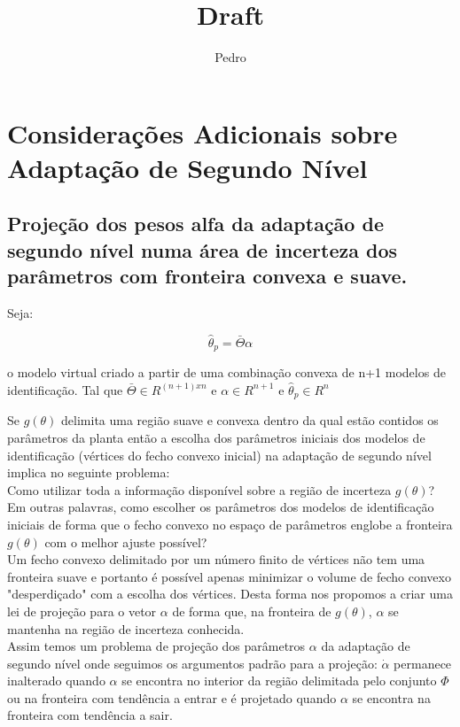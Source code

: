 \documentclass[11pt]{report}
\title{Draft}
\author{Pedro}
\begin{document}
\chapter{Considerações Adicionais sobre Adaptação de Segundo Nível}
\section{Projeção dos pesos alfa da adaptação de segundo nível numa área de incerteza dos parâmetros com fronteira convexa e suave.}

Seja:

\begin{equation}
\hat{\theta}_p = \bar{\Theta}\alpha 
\end{equation}

o modelo virtual criado a partir de uma combinação convexa de n+1 modelos de identificação. Tal que $\bar{\Theta}\in R^{(n+1)xn}$ e $\alpha \in R^{n+1}$ e $\hat{\theta}_p \in R^n$

Se $g(\theta)$ delimita uma região suave e convexa dentro da qual estão contidos os parâmetros da planta então a escolha dos parâmetros iniciais dos modelos de identificação (vértices do fecho convexo inicial) na adaptação de segundo nível implica no seguinte problema:\\

Como utilizar toda a informação disponível sobre a região de incerteza $g(\theta)$? Em outras palavras, como escolher os parâmetros dos modelos de identificação iniciais de forma que o fecho convexo no espaço de parâmetros englobe a fronteira $g(\theta)$ com o melhor ajuste possível?\\

Um fecho convexo delimitado por um número finito de vértices não tem uma fronteira suave e portanto é possível apenas minimizar o volume de fecho convexo "desperdiçado" com a escolha dos vértices. Desta forma nos propomos a criar uma lei de projeção para o vetor $\alpha$ de forma que, na fronteira de $g(\theta)$, $\alpha$ se mantenha na região de incerteza conhecida.\\

Assim temos um problema de projeção dos parâmetros $\alpha$ da adaptação de segundo nível onde seguimos os argumentos padrão para a projeção: $\dot{\alpha}$ permanece inalterado quando $\alpha$ se encontra no interior da região delimitada pelo conjunto $\Phi$ ou na fronteira com tendência a entrar e é projetado quando $\alpha$ se encontra na fronteira com tendência a sair.
\end{document}

